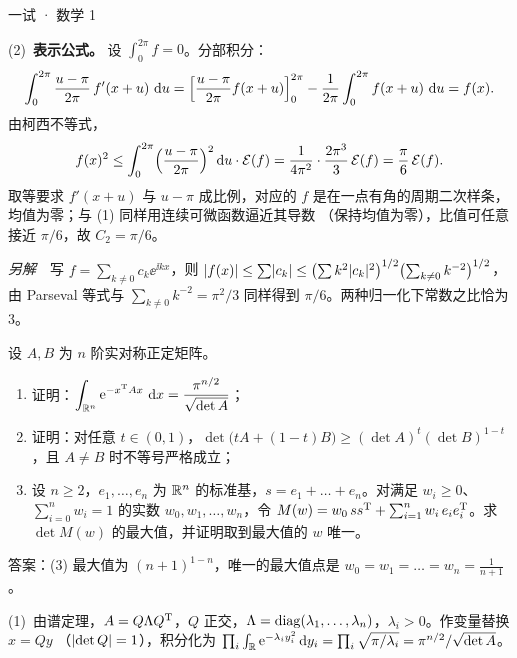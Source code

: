 \documentclass[cjk=noto, seal=first]{mojing-exam}
\begin{document}
\begin{paper}[time={建议 3 小时（训练设置）}, full=150]{一试 · 数学 1}
\begin{questions}
\begin{solution}
(2)~\textbf{表示公式。} 设 $\int_0^{2\pi}f=0$。分部积分：
\[
  \int_0^{2\pi}\frac{u-\pi}{2\pi}\,f'(x+u)\,\mathop{}\!\mathrm{d} u=\Bigl[\frac{u-\pi}{2\pi}f(x+u)\Bigr]_0^{2\pi}-\frac1{2\pi}\int_0^{2\pi}f(x+u)\,\mathop{}\!\mathrm{d} u=f(x).
\]
由柯西不等式，
\[
  f(x)^2\le\int_0^{2\pi}\Bigl(\frac{u-\pi}{2\pi}\Bigr)^2\mathop{}\!\mathrm{d} u\cdot\mathcal E(f)=\frac{1}{4\pi^2}\cdot\frac{2\pi^3}{3}\,\mathcal E(f)=\frac\pi6\,\mathcal E(f).
\]
取等要求 $f'(x+u)$ 与 $u-\pi$ 成比例，对应的 $f$ 是在一点有角的周期二次样条，均值为零；与 (1) 同样用连续可微函数逼近其导数
（保持均值为零），比值可任意接近 $\pi/6$，故 $C_2=\pi/6$。

\emph{另解}　写 $f=\sum_{k\ne0}c_k\ee^{\ii kx}$，则 $\lvert f(x)\rvert\le\sum\lvert c_k\rvert\le\bigl(\sum k^2\lvert c_k\rvert^2\bigr)^{1/2}\bigl(\sum_{k\ne0}k^{-2}\bigr)^{1/2}$，
由 Parseval 等式与 $\sum_{k\ne0}k^{-2}=\pi^2/3$ 同样得到 $\pi/6$。两种归一化下常数之比恰为 $3$。
\end{solution}

\question[25]
设 $A,B$ 为 $n$ 阶实对称正定矩阵。
\begin{enumerate}
  \item 证明：$\displaystyle\int_{\mathbb{R}^n}\mathrm{e}^{-x^{\mathrm{T}} Ax}\,\mathop{}\!\mathrm{d} x=\frac{\pi^{n/2}}{\sqrt{\det A}}$；
  \item 证明：对任意 $t\in(0,1)$，$\det\bigl(tA+(1-t)B\bigr)\ge(\det A)^t(\det B)^{1-t}$，且 $A\ne B$ 时不等号严格成立；
  \item 设 $n\ge2$，$e_1,\dots,e_n$ 为 $\mathbb{R}^n$ 的标准基，$s=e_1+\dots+e_n$。对满足 $w_i\ge0$、$\sum_{i=0}^{n}w_i=1$ 的实数
        $w_0,w_1,\dots,w_n$，令 $M(w)=w_0\,ss^{\mathrm{T}}+\sum_{i=1}^{n}w_i\,e_ie_i^{\mathrm{T}}$。求 $\det M(w)$ 的最大值，并证明取到最大值的 $w$ 唯一。
\end{enumerate}
\answerspace{2cm}
\begin{solution}
答案：(3) 最大值为 $(n+1)^{1-n}$，唯一的最大值点是 $w_0=w_1=\dots=w_n=\frac1{n+1}$。

(1)~由谱定理，$A=Q\Lambda Q^{\mathrm{T}}$，$Q$ 正交，$\Lambda=\operatorname{diag}(\lambda_1,\dots,\lambda_n)$，$\lambda_i>0$。作变量替换 $x=Qy$
（$\lvert\det Q\rvert=1$），积分化为 $\prod_i\int_{\mathbb{R}}\mathrm{e}^{-\lambda_iy_i^2}\mathop{}\!\mathrm{d} y_i=\prod_i\sqrt{\pi/\lambda_i}=\pi^{n/2}/\sqrt{\det A}$。


\end{solution}
\end{questions}
\end{paper}
\end{document}
